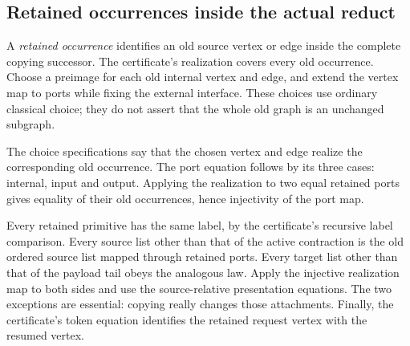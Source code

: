 


\subsection{Retained occurrences inside the actual reduct}

A \emph{retained occurrence} identifies an old source vertex or edge inside
the complete copying successor. The certificate's realization covers every
old occurrence. Choose a preimage for each old internal vertex and edge, and
extend the vertex map to ports while fixing the external interface. These
choices use ordinary classical choice; they do not assert that the whole old
graph is an unchanged subgraph.




The choice specifications say that the chosen vertex and edge realize the
corresponding old occurrence. The port equation follows by its three cases:
internal, input and output. Applying the realization to two equal retained
ports gives equality of their old occurrences, hence injectivity of the port
map.





Every retained primitive has the same label, by the certificate's recursive
label comparison. Every source list other than that of the active contraction
is the old ordered source list mapped through retained ports. Every target
list other than that of the payload tail obeys the analogous law. Apply the
injective realization map to both sides and use the source-relative
presentation equations. The two exceptions are essential: copying really
changes those attachments. Finally, the certificate's token equation
identifies the retained request vertex with the resumed vertex.


